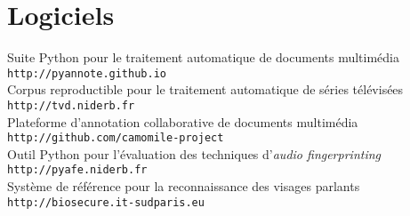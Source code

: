 \section{Logiciels}

Suite Python pour le traitement automatique de documents multim\'{e}dia\\
\texttt{\small http://pyannote.github.io} \cite{Bredin2017a} \\

Corpus reproductible pour le traitement automatique de s\'{e}ries t\'{e}l\'{e}vis\'{e}es\\
\texttt{\small http://tvd.niderb.fr} \cite{Roy2014a}\\

Plateforme d'annotation collaborative de documents multim\'{e}dia\\
\texttt{\small http://github.com/camomile-project} \cite{Poignant2016b} \\

Outil Python pour l'\'{e}valuation des techniques d'\emph{audio fingerprinting}\\
\texttt{\small http://pyafe.niderb.fr} \cite{Ramona2011}\\

Syst\`{e}me de r\'{e}f\'{e}rence pour la reconnaissance des visages parlants\\
\texttt{\small http://biosecure.it-sudparis.eu} \cite{Bredin2006a}
